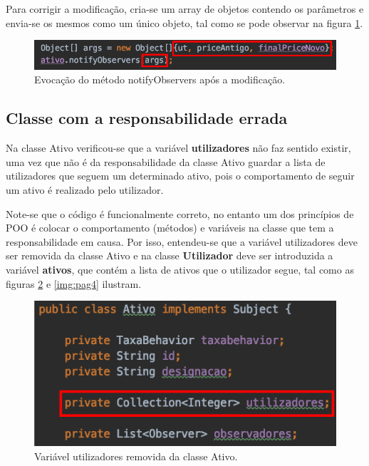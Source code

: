 \hspace{5mm} Para corrigir a modificação, cria-se um array de objetos contendo os parâmetros e envia-se os mesmos como um único objeto, tal como se pode observar na figura \ref{img:pag2}.

\begin{figure}[H]
	\centering
	\includegraphics[scale=0.55]{images/design_pattern_observer_after_2.png}
	\caption{Evocação do método notifyObservers após a modificação.}
	\label{img:pag2}
\end{figure}

\subsection{Classe com a responsabilidade errada}

\hspace{5mm} Na classe Ativo verificou-se que a variável \textbf{utilizadores} não faz sentido existir, uma vez que não é da responsabilidade da classe Ativo guardar a lista de utilizadores que seguem um determinado ativo, pois o comportamento de seguir um ativo é realizado pelo utilizador.

\hspace{5mm} Note-se que o código é funcionalmente correto, no entanto um dos princípios de POO é colocar o comportamento (métodos) e variáveis na classe que tem a responsabilidade em causa. Por isso, entendeu-se que a variável utilizadores deve ser removida da classe Ativo e na classe \textbf{Utilizador} deve ser introduzida a variável \textbf{ativos}, que contém a lista de ativos que o utilizador segue, tal como as figuras \ref{img:pag3} e \ref{img:pag4} ilustram.

\begin{figure}[H]
	\centering
	\includegraphics[scale=0.55]{images/POO_abuser_before_1.png}
	\caption{Variável utilizadores removida da classe Ativo.}
	\label{img:pag3}
\end{figure}

